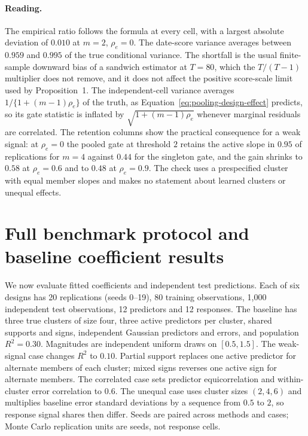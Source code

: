\documentclass[11pt,a4paper]{article}
\begin{document}
\paragraph{Reading.}
The empirical ratio follows the formula at every cell, with a largest absolute
deviation of $0.010$ at $m=2$, $\rho_e=0$. The date-score variance averages
between $0.959$ and $0.995$ of the true conditional variance. The shortfall is
the usual finite-sample downward bias of a sandwich estimator at $T=80$, which
the $T/(T-1)$ multiplier does not remove, and it does not affect the positive
score-scale limit used by Proposition~1. The independent-cell variance averages
$1/\{1+(m-1)\rho_e\}$ of the truth, as Equation~\eqref{eq:pooling-design-effect}
predicts, so its gate statistic is inflated by $\sqrt{1+(m-1)\rho_e}$ whenever
marginal residuals are correlated. The retention columns show the practical
consequence for a weak signal: at $\rho_e=0$ the pooled gate at threshold $2$
retains the active slope in $0.95$ of replications for $m=4$ against $0.44$
for the singleton gate, and the gain shrinks to $0.58$ at $\rho_e=0.6$ and to
$0.48$ at $\rho_e=0.9$. The check uses a prespecified cluster with equal member
slopes and makes no statement about learned clusters or unequal effects.

\FloatBarrier

\section{Full benchmark protocol and baseline coefficient results}\label{app:fitted-protocol}

We now evaluate fitted coefficients and independent test predictions. Each
of six designs has 20 replications (seeds 0--19), 80 training observations,
1,000 independent test observations, 12 predictors and 12 responses.
The baseline has three true clusters of size four, three active predictors
per cluster, shared supports and signs, independent Gaussian predictors
and errors, and population $R^2=0.30$. Magnitudes are independent uniform
draws on $[0.5,1.5]$. The weak-signal case changes $R^2$ to $0.10$.
Partial support replaces one active predictor for alternate members of each
cluster; mixed signs reverses one active sign for alternate members.
The correlated case sets predictor equicorrelation and within-cluster
error correlation to $0.6$. The unequal case uses cluster sizes $(2,4,6)$
and multiplies baseline error standard deviations by a sequence from
$0.5$ to $2$, so response signal shares then differ. Seeds are paired across
methods and cases; Monte Carlo replication units are seeds, not response cells.
\end{document}
